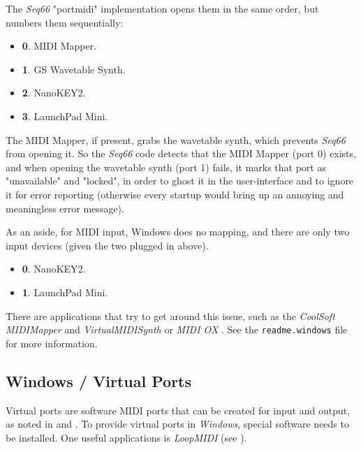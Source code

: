    The \textsl{Seq66} "portmidi" implementation opens them in
   the same order, but numbers them sequentially:

   \begin{itemize}
      \item \textbf{0}. MIDI Mapper.
      \item \textbf{1}. GS Wavetable Synth.
      \item \textbf{2}. NanoKEY2.
      \item \textbf{3}. LaunchPad Mini.
   \end{itemize}

   The MIDI Mapper, if present, grabs the wavetable synth, which prevents
   \textsl{Seq66} from opening it.
   So the \textsl{Seq66}
   code detects that the MIDI Mapper (port 0) exists, and when opening
   the wavetable synth (port 1) fails, it marks that port as
   "unavailable" and "locked", in order to ghost it in the user-interface
   and to ignore it for error reporting (otherwise every startup would bring
   up an annoying and meaningless error message).

   As an aside, for MIDI input, Windows does no mapping, and there are
   only two input devices (given the two plugged in above).

   \begin{itemize}
      \item \textbf{0}. NanoKEY2.
      \item \textbf{1}. LaunchPad Mini.
   \end{itemize}

   There are applications that try to get around this issue, such as
   the \textsl{CoolSoft MIDIMapper} and \textsl{VirtualMIDISynth}
   \cite{midimapper} or \textsl{MIDI OX} \cite{midiox}.
   See the \texttt{readme.windows} file for more information.

\subsection{Windows / Virtual Ports}
\label{subsec:windows_virtual_ports}

   Virtual ports are software MIDI ports that can be created for
   input and output, as noted in
    and
   .
   To provide virtual ports in \textsl{Windows},
   special software needs to be installed.
   One useful applications is \textsl{LoopMIDI} (see \cite{loopmidi}).

